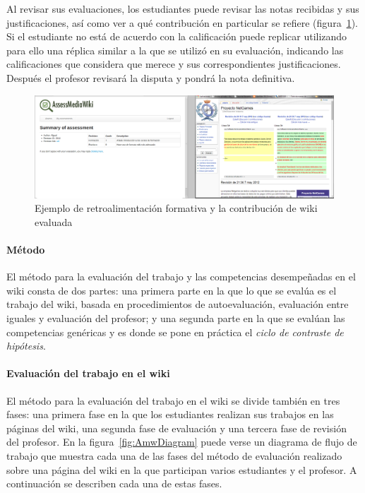 Al revisar sus evaluaciones, los estudiantes puede revisar las notas recibidas y sus justificaciones, así como ver a qué contribución en particular se refiere (figura~\ref{fig:AmwFormative}). Si el estudiante no está de acuerdo con la calificación puede replicar utilizando para ello una réplica similar a la que se utilizó en su evaluación, indicando las calificaciones que considera que merece y sus correspondientes justificaciones. Después el profesor revisará la disputa y pondrá la nota definitiva.

\begin{figure}
  \begin{center}
    \includegraphics[scale=0.19]{AmwFormative.png}
  \end{center}
  \caption{Ejemplo de retroalimentación formativa y la contribución de wiki evaluada}
  \label{fig:AmwFormative}
\end{figure}

\paragraph{Método}

El método para la evaluación del trabajo y las competencias desempeñadas en el wiki consta de dos partes: una primera parte en la que lo que se evalúa es el trabajo del wiki, basada en procedimientos de autoevaluación, evaluación entre iguales y evaluación del profesor; y una segunda parte en la que se evalúan las competencias genéricas y es donde se pone en práctica el \emph{ciclo de contraste de hipótesis}.

\paragraph{Evaluación del trabajo en el wiki}

El método para la evaluación del trabajo en el wiki se divide también en tres fases: una primera fase en la que los estudiantes realizan sus trabajos en las páginas del wiki, una segunda fase de evaluación y una tercera fase de revisión del profesor. En la figura~\ref{fig:AmwDiagram} puede verse un diagrama de flujo de trabajo que muestra cada una de las fases del método de evaluación realizado sobre una página del wiki en la que participan varios estudiantes y el profesor. A continuación se describen cada una de estas fases.


